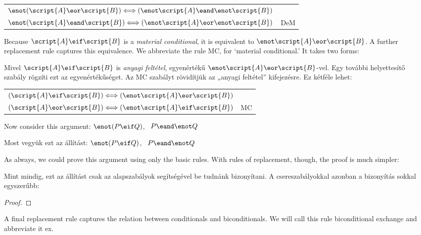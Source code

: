 

\begin{center}
\begin{tabular}{rl}
$\enot(\script{A}\eor\script{B}) \Longleftrightarrow (\enot\script{A}\eand\enot\script{B})$\\
$\enot(\script{A}\eand\script{B}) \Longleftrightarrow (\enot\script{A}\eor\enot\script{B})$
& DeM
\end{tabular}
\end{center}

Because $\script{A}\eif\script{B}$ is a \emph{material conditional}, it is equivalent to $\enot\script{A}\eor\script{B}$. A further replacement rule captures this equivalence. We abbreviate the rule MC, for `material conditional.' It takes two forms:

Mivel $\script{A}\eif\script{B}$ is \emph{anyagi feltétel}, egyenértékű $\enot\script{A}\eor\script{B}$-vel. Egy további helyettesítő szabály rögzíti ezt az egyenértékűséget. Az MC szabályt rövidítjük az „anyagi feltétel” kifejezésre. Ez kétféle lehet:

\begin{center}
\begin{tabular}{rl}
$(\script{A}\eif\script{B}) \Longleftrightarrow (\enot\script{A}\eor\script{B})$ &\\
$(\script{A}\eor\script{B}) \Longleftrightarrow (\enot\script{A}\eif\script{B})$ & MC
\end{tabular}
\end{center}

Now consider this argument: $\enot(P \eif Q)$, \therefore\ $P \eand \enot Q$

Most vegyük ezt az állítást: $\enot(P \eif Q)$, \therefore\ $P \eand \enot Q$

As always, we could prove this argument using only the basic rules. With rules of replacement, though, the proof is much simpler:

Mint mindig, ezt az állítást csak az alapszabályok segítségével be tudnánk bizonyítani. A csereszabályokkal azonban a bizonyítás sokkal egyszerűbb:

\begin{proof}
\end{proof}

A final replacement rule captures the relation between conditionals and biconditionals. We will call this rule biconditional exchange and abbreviate it {\eiff}{ex}.

